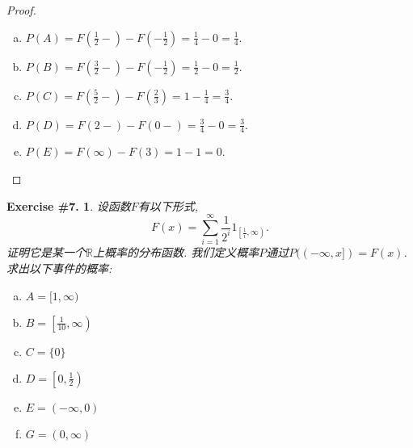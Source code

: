 \documentclass[UTF8, a4paper]{article}
\newtheorem{exercise}{Exercise \#7.}
\begin{document}
\begin{proof}
\begin{enumerate}[a)]
    \item \(P(A) = F\left(\frac{1}{2}-\right) - F\left(-\frac{1}{2}\right) = \frac{1}{4} - 0 = \frac{1}{4}\).
    \item \(P(B) = F\left(\frac{3}{2}-\right) - F\left(-\frac{1}{2}\right) = \frac{1}{2} - 0 = \frac{1}{2}\).
    \item \(P(C) = F\left(\frac{5}{2}-\right) - F\left(\frac{2}{3}\right) = 1 - \frac{1}{4} = \frac{3}{4}\).
    \item \(P(D) = F(2-) - F(0-) = \frac{3}{4} - 0 = \frac{3}{4}\).
    \item \(P(E) = F(\infty) - F(3) = 1 - 1 = 0\).    
\end{enumerate}

\end{proof}



\begin{framed}
\begin{exercise}
设函数$F$有以下形式,
$$
F(x)=\sum_{i=1}^{\infty} \frac{1}{2^i} 1_{\left[\frac{1}{i}, \infty\right)} .
$$
证明它是某一个\(\mathbb{R}\)上概率的分布函数. 我们定义概率\(P\)通过$
P((-\infty, x])=F(x)
$. 求出以下事件的概率:
\begin{enumerate}[a)]
    \item $A=[1, \infty)$
    \item $B=\left[\frac{1}{10}, \infty\right)$
    \item $C=\{0\}$
    \item $D=\left[0, \frac{1}{2}\right)$
    \item $E=(-\infty, 0)$
    \item $G=(0, \infty)$
\end{enumerate}
\end{exercise}
\end{framed}
\end{document}
